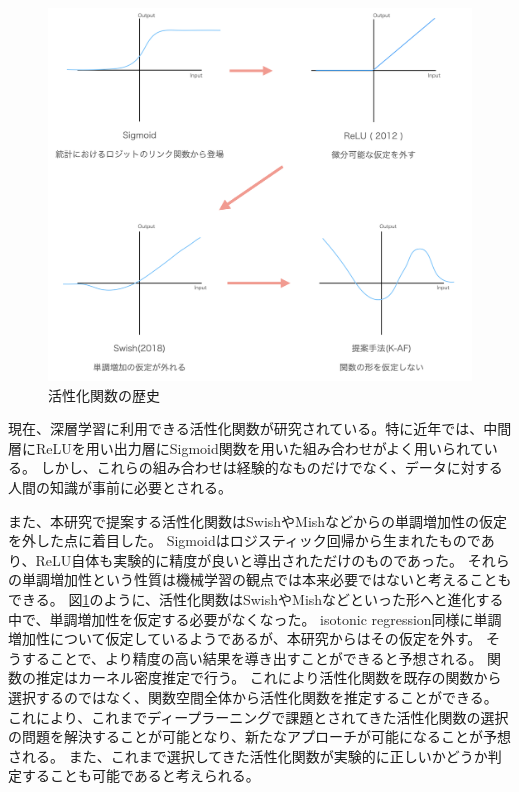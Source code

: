\begin{figure}[hbtp]
\includegraphics[width=15cm]{asset/history_af.png}
	\caption{活性化関数の歴史}
	\label{history_af}
\end{figure}

現在、深層学習に利用できる活性化関数が研究されている。特に近年では、中間層にReLUを用い出力層にSigmoid関数を用いた組み合わせがよく用いられている。
しかし、これらの組み合わせは経験的なものだけでなく、データに対する人間の知識が事前に必要とされる。

また、本研究で提案する活性化関数はSwishやMishなどからの単調増加性の仮定を外した点に着目した。
Sigmoidはロジスティック回帰から生まれたものであり、ReLU自体も実験的に精度が良いと導出されただけのものであった。
それらの単調増加性という性質は機械学習の観点では本来必要ではないと考えることもできる。
図\ref{history_af}のように、活性化関数はSwishやMishなどといった形へと進化する中で、単調増加性を仮定する必要がなくなった。
isotonic regression同様に単調増加性について仮定しているようであるが、本研究からはその仮定を外す。
そうすることで、より精度の高い結果を導き出すことができると予想される。
関数の推定はカーネル密度推定で行う。
これにより活性化関数を既存の関数から選択するのではなく、関数空間全体から活性化関数を推定することができる。
これにより、これまでディープラーニングで課題とされてきた活性化関数の選択の問題を解決することが可能となり、新たなアプローチが可能になることが予想される。
また、これまで選択してきた活性化関数が実験的に正しいかどうか判定することも可能であると考えられる。


